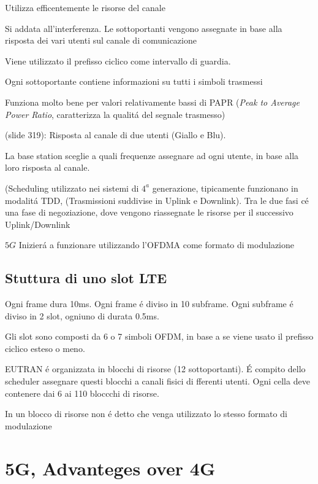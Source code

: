 \documentclass{article}
\begin{document}
Utilizza efficentemente le risorse del canale

Si addata all'interferenza. Le sottoportanti vengono assegnate in base alla risposta dei vari utenti sul canale di comunicazione

Viene utilizzato il prefisso ciclico come intervallo di guardia.

Ogni sottoportante contiene informazioni su tutti i simboli trasmessi

Funziona molto bene per valori relativamente bassi di PAPR (\textit{Peak to Average Power Ratio}, caratterizza la qualit\'a del segnale trasmesso)

(slide 319): Risposta al canale di due utenti (Giallo e Blu).

La base station sceglie a quali frequenze assegnare ad ogni utente, in base alla loro risposta al canale.

(Scheduling utilizzato nei sistemi di $4^a$ generazione, tipicamente funzionano in modalit\'a TDD, (Trasmissioni suddivise in Uplink e Downlink). Tra le due fasi c\'e una fase di negoziazione, dove vengono riassegnate le risorse per il successivo Uplink/Downlink


$5G$ Inizier\'a a funzionare utilizzando l'OFDMA come formato di modulazione


\subsection{Stuttura di uno slot LTE}
Ogni frame dura 10ms. Ogni frame \'e diviso in 10 subframe. Ogni subframe \'e diviso in 2 slot, ogniuno di durata 0.5ms.

Gli slot sono composti da 6 o 7 simboli OFDM, in base a se viene usato il prefisso ciclico esteso o meno.

EUTRAN \'e organizzata in blocchi di risorse (12 sottoportanti). \'E compito dello scheduler assegnare questi blocchi a canali fisici di fferenti utenti. Ogni cella deve contenere dai 6 ai 110 bloccchi di risorse.

In un blocco di risorse non \'e detto che venga utilizzato lo stesso formato di modulazione

\section{5G, Advanteges over 4G}
\end{document}
